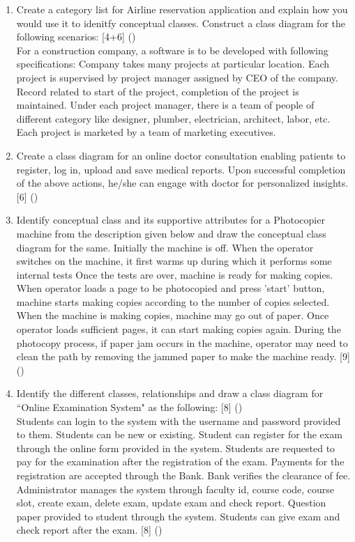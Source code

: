 \documentclass[12pt]{article}
\begin{document}
\begin{enumerate}
      \item Create a category list for Airline reservation application and explain how you would use it to idenitfy conceptual classes. Construct a class diagram for the following scenarios: \hfill [4+6] ()\\
        For a construction company, a software is to be developed with following specifications: Company takes many projects at particular location. Each project is supervised by project manager assigned by CEO of the company. Record related to start of the project, completion of the project is maintained. Under each project manager, there is a team of people of different category like designer, plumber, electrician, architect, labor, etc. Each project is marketed by a team of marketing executives.

      \item Create a class diagram for an online doctor consultation enabling patients to register, log in, upload and save medical reports. Upon successful completion of the above actions, he/she can engage with doctor for personalized insights. \hfill [6] ()

      \item Identify conceptual class and its supportive attributes for a Photocopier machine from the description given below and draw the conceptual class diagram for the same.
        Initially the machine is off. When the operator switches on the machine, it first warms up during which it performs some internal tests Once the tests are over, machine is ready for making copies. When operator loads a page to be photocopied and press 'start' button, machine starts making copies according to the number of copies selected. When the machine is making copies, machine may go out of paper. Once operator loads sufficient pages, it can start making copies again. During the photocopy process, if paper jam occurs in the machine, operator may need to clean the path by removing the jammed paper to make the machine ready. \hfill [9] ()

      \item Identify the different classes, relationships and draw a class diagram for ``Online Examination System" as the following: \hfill [8] ()\\
        Students can login to the system with the username and password provided to them. Students can be new or existing. Student can register for the exam through the online form provided in the system. Students are requested to pay for the examination after the registration of the exam. Payments for the registration are accepted through the Bank. Bank verifies the clearance of fee. Administrator manages the system through faculty id, course code, course slot, create exam, delete exam, update exam and check report. Question paper provided to student through the system. Students can give exam and check report after the exam. \hfill [8] ()


\end{enumerate}
\end{document}
